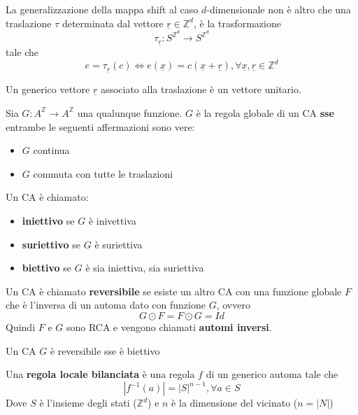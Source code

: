 La generalizzazione della mappa shift al caso $d$-dimensionale non è altro che una 
traslazione $\tau$ determinata dal vettore $\underline{r}\in  \mathbb{Z}^d$, è
la trasformazione
$$\tau_{\underline{r}} :  S^{\mathbb{Z}^d} \rightarrow  S^{\mathbb{Z}^d}$$
tale che 
$$e =\tau_{\underline{r}}(c) \iff e(\underline{x}) =  c(\underline{x}+\underline{r}), \forall \underline{x},\underline{r}\in \mathbb{Z}^d$$

Un generico vettore $\underline{r}$ associato alla traslazione è un vettore 
unitario.

\begin{teorema}  
    Sia $G:A^\mathbb{Z}\rightarrow A^\mathbb{Z}$ una qualunque funzione.
    $G$ è la regola globale di un CA \textbf{sse} entrambe le seguenti affermazioni
    sono vere:
    \begin{itemize}
        \item $G$ continua
        \item $G$ commuta con tutte le traslazioni
    \end{itemize}
\end{teorema}

\begin{definizione} 
    Un CA è chiamato:
    \begin{itemize}
        \item \textbf{iniettivo} se $G$ è inivettiva
        \item \textbf{suriettivo} se $G$ è suriettiva
        \item \textbf{biettivo} se $G$ è sia iniettiva, sia suriettiva
    \end{itemize}

\end{definizione}


\begin{definizione} 
    Un CA è chiamato \textbf{reversibile} se esiste un altro CA con una funzione 
    globale $F$ che è l'inversa di un automa dato con funzione $G$, ovvero
    $$ G\odot F= F\odot G = Id$$
    Quindi $F$ e $G$ sono RCA e vengono chiamati \textbf{automi inversi}.
\end{definizione}

\begin{teorema}
    Un CA $G$ è reversibile sse è biettivo
\end{teorema}

\begin{definizione} 
    Una \textbf{regola locale bilanciata} è una regola $f$ di un generico automa 
    tale che 
    $$|f^{-1}(a)| = | S | ^{n-1}, \forall a \in S$$
    Dove $S$ è l'insieme degli stati ($\mathbb{Z}^d$) e $n$ è la dimensione del 
    vicinato ($n=|N|$)
\end{definizione}

